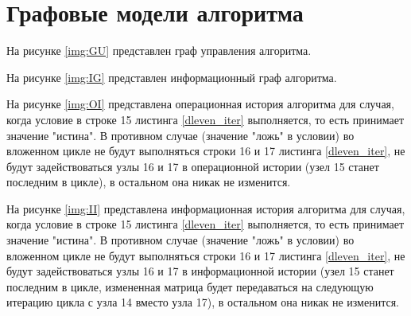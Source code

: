 \section{Графовые модели алгоритма}
На рисунке \ref{img:GU} представлен граф управления алгоритма.


На рисунке \ref{img:IG} представлен информационный граф алгоритма.


\clearpage

На рисунке \ref{img:OI} представлена операционная история алгоритма для случая, когда условие в строке 15 листинга \ref{dleven_iter} выполняется, то есть принимает значение "истина". В противном случае (значение "ложь" в условии) во вложенном цикле не будут выполняться строки 16 и 17 листинга \ref{dleven_iter}, не будут задействоваться узлы 16 и 17 в операционной истории (узел 15 станет последним в цикле), в остальном она никак не изменится.


\clearpage

На рисунке \ref{img:II} представлена информационная история алгоритма для случая, когда условие в строке 15 листинга \ref{dleven_iter} выполняется, то есть принимает значение "истина". В противном случае (значение "ложь" в условии) во вложенном цикле не будут выполняться строки 16 и 17 листинга \ref{dleven_iter}, не будут задействоваться узлы 16 и 17 в информационной истории (узел 15 станет последним в цикле, измененная матрица будет передаваться на следующую итерацию цикла с узла 14 вместо узла 17), в остальном она никак не изменится.

